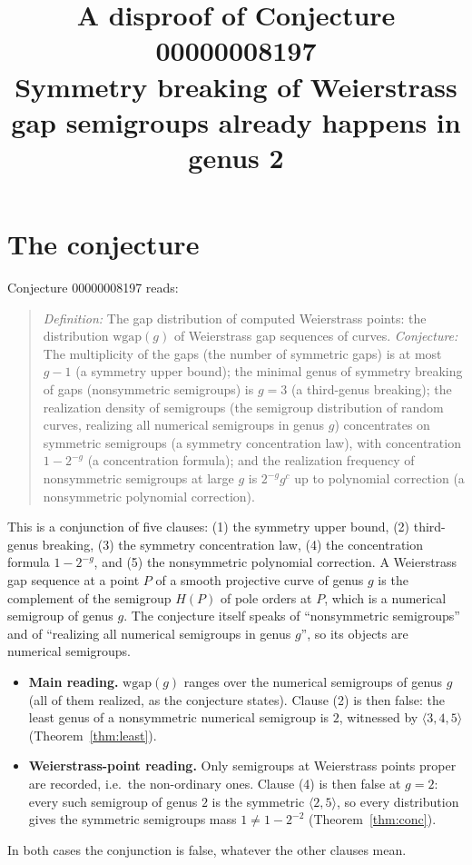 \documentclass[11pt]{article}
\title{A disproof of Conjecture 00000008197\\[2pt]
\large Symmetry breaking of Weierstrass gap semigroups already happens in genus 2}
\date{}
\theoremstyle{definition}
\theoremstyle{remark}
\renewcommand{\_}{\oldus\allowbreak}
\begin{document}
\sloppy
\maketitle

\section{The conjecture}

Conjecture 00000008197 reads:

\begin{quote}
\emph{Definition:} The gap distribution of computed Weierstrass points: the distribution $\mathrm{wgap}(g)$
of Weierstrass gap sequences of curves. \emph{Conjecture:} The multiplicity of the gaps (the number of
symmetric gaps) is at most $g-1$ (a symmetry upper bound); the minimal genus of symmetry breaking of gaps
(nonsymmetric semigroups) is $g = 3$ (a third-genus breaking); the realization density of semigroups (the
semigroup distribution of random curves, realizing all numerical semigroups in genus $g$) concentrates on
symmetric semigroups (a symmetry concentration law), with concentration $1 - 2^{-g}$ (a concentration
formula); and the realization frequency of nonsymmetric semigroups at large $g$ is $2^{-g} g^c$ up to
polynomial correction (a nonsymmetric polynomial correction).
\end{quote}

This is a conjunction of five clauses: (1) the symmetry upper bound, (2) third-genus breaking,
(3) the symmetry concentration law, (4) the concentration formula $1-2^{-g}$, and (5) the nonsymmetric
polynomial correction. A Weierstrass gap sequence at a point $P$ of a smooth projective curve of genus $g$
is the complement of the semigroup $H(P)$ of pole orders at $P$, which is a numerical semigroup of genus $g$.
The conjecture itself speaks of ``nonsymmetric semigroups'' and of ``realizing all numerical semigroups in
genus $g$'', so its objects are numerical semigroups.

\begin{itemize}
  \item \textbf{Main reading.} $\mathrm{wgap}(g)$ ranges over the numerical semigroups of genus $g$ (all of
  them realized, as the conjecture states). Clause (2) is then false: the least genus of a nonsymmetric
  numerical semigroup is $2$, witnessed by $\langle 3,4,5\rangle$ (Theorem~\ref{thm:least}).
  \item \textbf{Weierstrass-point reading.} Only semigroups at Weierstrass points proper are recorded,
  i.e.\ the non-ordinary ones. Clause (4) is then false at $g=2$: every such semigroup of genus $2$ is
  the symmetric $\langle 2,5\rangle$, so every distribution gives the symmetric semigroups mass
  $1 \ne 1 - 2^{-2}$ (Theorem~\ref{thm:conc}).
\end{itemize}
In both cases the conjunction is false, whatever the other clauses mean.
\end{document}
